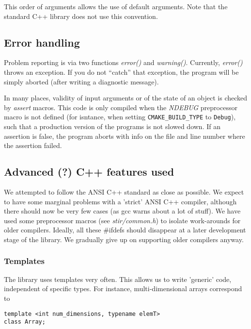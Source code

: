 \documentclass{article}
\begin{document}
This order of arguments allows the use of default arguments. 
Note that the standard C++ library does not use this convention.

\subsection{
Error handling }

Problem reporting is via two functions \textit{error()} and \textit{warning()}. 
Currently, \textit{error()} throws an exception. If you do not ``catch'' that
exception, the program will be simply aborted (after writing 
a diagnostic message). 

In many places, validity of input arguments or of the state of 
an object is checked by \textit{assert} macros. This code is only 
compiled when the \textit{NDEBUG} preprocessor macro is not defined (for isntance,
when setting \texttt{CMAKE\_BUILD\_TYPE} to \texttt{Debug}), 
such that a production version of the programs 
is not slowed down. If an assertion is false, the program aborts 
with info on the file and line number where the assertion failed.

\subsection{\label{ssect:AdvancedCppFeatures}
Advanced (?) C++ features used}

We attempted to follow the ANSI C++ standard as close as possible. 
We expect to have some marginal problems with a 'strict' ANSI 
C++ compiler, although there should now be very few cases (as 
gcc warns about a lot of stuff). We have used some preprocessor 
macros (see \textit{stir/common.h}) to isolate work-arounds for older 
compilers. Ideally, all these \#ifdefs should disappear at a 
later development stage of the library. We gradually give up 
on supporting older compilers anyway.


\subsubsection{Templates}
The library uses templates very often. This allows us to write 
'generic' code, independent of specific types. For instance, 
multi-dimensional arrays correspond to 

\begin{verbatim}
template <int num_dimensions, typename elemT>
class Array;
\end{verbatim}
\end{document}
